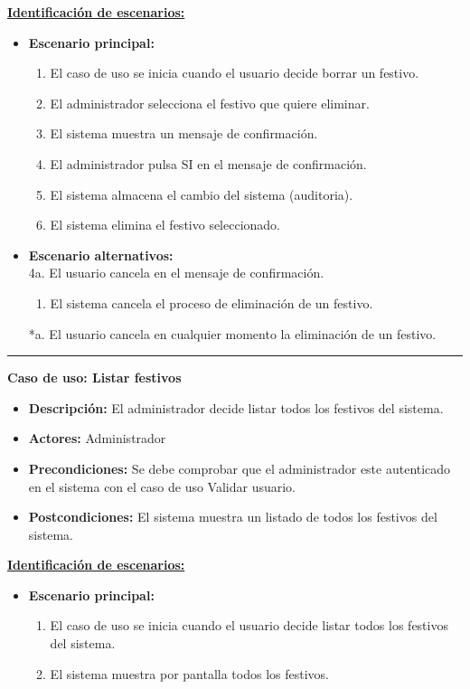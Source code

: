 \underline{\textbf{Identificación de escenarios:}}
\begin{itemize}\renewcommand{\labelitemi}{$\circ$}
 \item \textbf{Escenario principal:}
         \begin{enumerate}
          \item El caso de uso se inicia cuando el usuario decide borrar un festivo.
          \item El administrador selecciona el festivo que quiere eliminar.
          \item El sistema muestra un mensaje de confirmación.
          \item El administrador pulsa SI en el mensaje de confirmación.
 	  \item El sistema almacena el cambio del sistema (auditoria).
          \item El sistema elimina el festivo seleccionado.
         \end{enumerate}
  \item \textbf{Escenario alternativos:}\\
  			4a. El usuario cancela en el mensaje de confirmación.
  			\begin{enumerate}
  			\item El sistema cancela el proceso de eliminación de un festivo.
  			\end{enumerate}
          *a. El usuario cancela en cualquier momento la eliminación de un festivo.
\end{itemize}

\smallskip
\hrule height 1pt
\smallskip

\textbf{Caso de uso: Listar festivos}
\begin{itemize}\renewcommand{\labelitemi}{$\cdot$}
 \item \textbf{Descripción:} El administrador decide listar todos los festivos del sistema.
  \item \textbf{Actores:} Administrador
  \item \textbf{Precondiciones:} Se debe comprobar que el administrador este autenticado en el sistema con el caso de uso Validar usuario.
  \item \textbf{Postcondiciones:} El sistema muestra un listado de todos los festivos del sistema.
\end{itemize}
\underline{\textbf{Identificación de escenarios:}}
\begin{itemize}\renewcommand{\labelitemi}{$\circ$}
 \item \textbf{Escenario principal:}
         \begin{enumerate}
          \item El caso de uso se inicia cuando el usuario decide listar todos los festivos del sistema.
	  \item El sistema muestra por pantalla todos los festivos.
         \end{enumerate}
\end{itemize}

